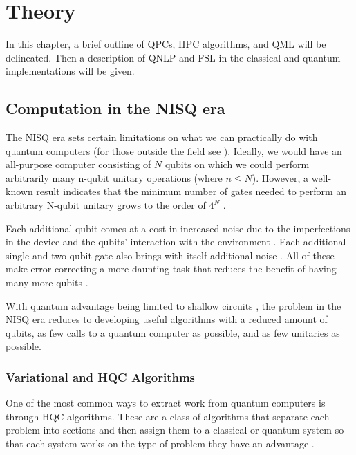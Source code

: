 \chapter{Theory} \label{chap:Theory}

In this chapter, a brief outline of QPCs, HPC algorithms, and QML will be delineated. Then a description of QNLP and FSL in the classical and quantum implementations will be given.

\section{Computation in the NISQ era}\label{sec:QPC,HPC}

The NISQ era sets certain limitations on what we can practically do with quantum computers (for those outside the field see \cite{lau_nisq_2022}). Ideally, we would have an all-purpose computer consisting of $N$ qubits on which we could perform arbitrarily many n-qubit unitary operations (where $n \leq N$). However, a well-known result indicates that the minimum number of gates needed to perform an arbitrary N-qubit unitary grows to the order of $4^N$ \cite{barenco_elementary_1995}.

Each additional qubit comes at a cost in increased noise due to the imperfections in the device \cite{krantz_quantum_2019} and the qubits' interaction with the environment \cite{georgopoulos_modeling_2021}. Each additional single and two-qubit gate also brings with itself additional noise \cite{di_bartolomeo_noisy_2023}. All of these make error-correcting a more daunting task that reduces the benefit of having many more qubits \cite{knill_theory_2000}.

With quantum advantage being limited to shallow circuits \cite{bravyi_quantum_2018}, the problem in the NISQ era reduces to developing useful algorithms with a reduced amount of qubits, as few calls to a quantum computer as possible, and as few unitaries as possible.

\subsection{Variational and HQC Algorithms}

One of the most common ways to extract work from quantum computers is through HQC algorithms. These are a class of algorithms that separate each problem into sections and then assign them to a classical or quantum system so that each system works on the type of problem they have an advantage \cite{mcclean_theory_2016}.

